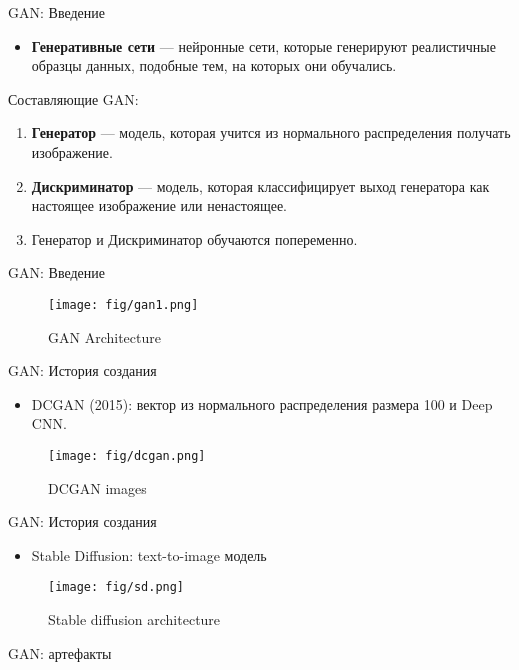 \documentclass[handout]{beamer}
\begin{document}
\begin{frame}{GAN: Введение}
	\begin{itemize}
		\item \textbf{Генеративные сети} --- нейронные сети, которые генерируют реалистичные образцы данных, подобные тем, на которых они обучались.
	\end{itemize}
	Составляющие GAN:

	\begin{enumerate}
		\item \textbf{Генератор} --- модель, которая учится из нормального распределения получать изображение.
		\item \textbf{Дискриминатор} --- модель, которая классифицирует выход генератора как настоящее изображение или ненастоящее.
		\item Генератор и Дискриминатор обучаются попеременно.
	\end{enumerate}
\end{frame}

\begin{frame}{GAN: Введение}
	\begin{figure}
	    \texttt{[image: fig/gan1.png]}
	    \caption{\small GAN Architecture
	    } 
	    \label{fig:w_series}
	\end{figure}
\end{frame}

\begin{frame}{GAN: История создания}
	\begin{itemize}
		\item DCGAN (2015): вектор из нормального распределения размера 100  и Deep CNN.
	\end{itemize}
	\begin{figure}
	    \texttt{[image: fig/dcgan.png]}
	    \caption{\small DCGAN images
	    } 
	    \label{fig:w_series}
	\end{figure}
\end{frame}

\begin{frame}{GAN: История создания}
	\begin{itemize}
		\item Stable Diffusion: text-to-image модель
	\end{itemize}
	\begin{figure}
	    \texttt{[image: fig/sd.png]}
	    \caption{\small Stable diffusion architecture
	    } 
	    \label{fig:w_series}
	\end{figure}
\end{frame}

\begin{frame}{GAN: артефакты}

\end{frame}
\end{document}
